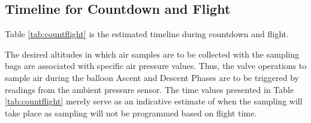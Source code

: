 \subsection{Timeline for Countdown and Flight}
Table \ref{tab:countflight} is the estimated timeline during countdown and flight. 

The desired altitudes in which air samples are to be collected with the sampling bags are associated with specific air pressure values. Thus, the valve operations to sample air during the balloon Ascent and Descent Phases are to be triggered by readings from the ambient pressure sensor. The time values presented in Table \ref{tab:countflight} merely serve as an indicative estimate of when the sampling will take place as sampling will not be programmed based on flight time.

